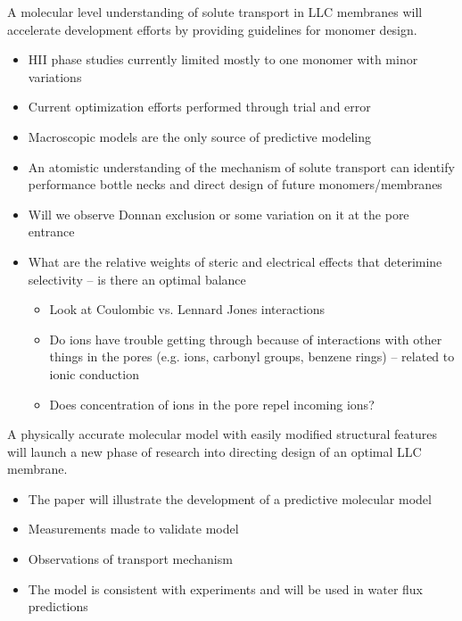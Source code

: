\documentclass{article}
\begin{document}
	A molecular level understanding of solute transport in LLC membranes will accelerate development efforts by providing guidelines for monomer design.
	\begin{itemize}
		\item HII phase studies currently limited mostly to one monomer with minor variations
		\item Current optimization efforts performed through trial and error
		\item Macroscopic models are the only source of predictive modeling
		\item An atomistic understanding of the mechanism of solute transport can identify
		performance bottle necks and direct design of future monomers/membranes
		\item Will we observe Donnan exclusion or some variation on it at the pore entrance
		\item What are the relative weights of steric and electrical effects that deterimine selectivity -- is there an optimal balance
		\begin{itemize}
			\item Look at Coulombic vs. Lennard Jones interactions
			\item Do ions have trouble getting through because of interactions with other things in the pores (e.g. ions, carbonyl groups, benzene rings) -- related to ionic conduction
			\item Does concentration of ions in the pore repel incoming ions?
		\end{itemize}
	\end{itemize}
	A physically accurate molecular model with easily modified structural features will launch a new phase of research into directing design of an optimal LLC membrane.
	\begin{itemize}
		\item The paper will illustrate the development of a predictive molecular model
		\item Measurements made to validate model
		\item Observations of transport mechanism
		\item The model is consistent with experiments and will be used in water flux predictions
	\end{itemize}
	
\end{document}
